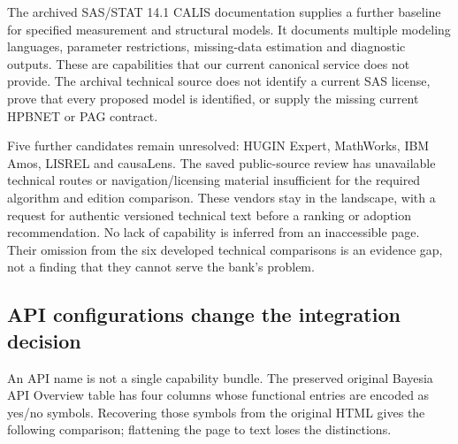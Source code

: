 The archived SAS/STAT 14.1 CALIS documentation supplies a further
baseline for specified measurement and structural models. It documents
multiple modeling languages, parameter restrictions, missing-data
estimation and diagnostic outputs. These are capabilities that our
current canonical service does not provide. The archival technical
source does not identify a current SAS license, prove that every
proposed model is identified, or supply the missing current HPBNET or
PAG contract. \citep{exec13_latent_sas_calis}

Five further candidates remain unresolved: HUGIN Expert, MathWorks, IBM
Amos, LISREL and causaLens. The saved public-source review has
unavailable technical routes or navigation/licensing material
insufficient for the required algorithm and edition comparison. These
vendors stay in the landscape, with a request for authentic versioned
technical text before a ranking or adoption recommendation. No lack of
capability is inferred from an inaccessible page. Their omission from
the six developed technical comparisons is an evidence gap, not a
finding that they cannot serve the bank's problem.

\hypertarget{api-configurations-change-the-integration-decision}{%
\subsection{API configurations change the integration
decision}\label{api-configurations-change-the-integration-decision}}

An API name is not a single capability bundle. The preserved original
Bayesia API Overview table has four columns whose functional entries are
encoded as yes/no symbols. Recovering those symbols from the original
HTML gives the following comparison; flattening the page to text loses
the distinctions. \citep{exec13_bayesia_api}

